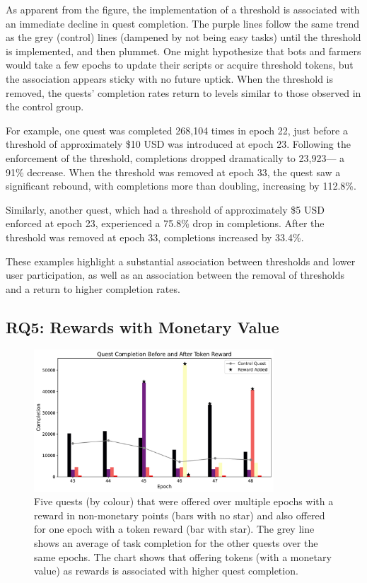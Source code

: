 As apparent from the figure, the implementation of a threshold is associated with an immediate decline in quest completion. The purple lines follow the same trend as the grey (control) lines (dampened by not being easy tasks) until the threshold is implemented, and then plummet. One might hypothesize that bots and farmers would take a few epochs to update their scripts or acquire threshold tokens, but the association appears sticky with no future uptick. When the threshold is removed, the quests' completion rates return to levels similar to those observed in the control group.

For example, one quest was completed 268,104 times in epoch 22, just before a threshold of approximately \$10 USD was introduced at epoch 23. Following the enforcement of the threshold, completions dropped dramatically to 23,923— a 91\% decrease. When the threshold was removed at epoch 33, the quest saw a significant rebound, with completions more than doubling, increasing by 112.8\%.

Similarly, another quest, which had a threshold of approximately \$5 USD enforced at epoch 23, experienced a 75.8\% drop in completions. After the threshold was removed at epoch 33, completions increased by 33.4\%. 

These examples highlight a substantial association between thresholds and lower user participation, as well as an association between the removal of thresholds and a return to higher completion rates.



\subsection{RQ5: Rewards with Monetary Value}

\begin{figure}[t]
    \centering
    \includegraphics[width=0.8\textwidth]{figures/tokens.pdf}
    \caption{Five quests (by colour) that were offered over multiple epochs with a reward in non-monetary points (bars with no star) and also offered for one epoch with a token reward (bar with star). The grey line shows an average of task completion for the other quests over the same epochs. The chart shows that offering tokens (with a monetary value) as rewards is associated with higher quest completion. \label{fig:tokens}}
\end{figure}

